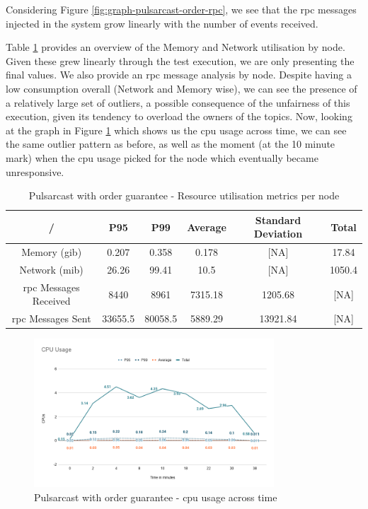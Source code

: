 Considering Figure \ref{fig:graph-pulsarcast-order-rpc}, we see that the
\acrshort{rpc} messages injected in the system grow linearly with the number of
events received.

Table \ref{table:pulsarcast-order} provides an overview of the Memory and
Network utilisation by node. Given these grew linearly through the test
execution, we are only presenting the final values. We also provide an \acrshort{rpc}
message analysis by node. Despite having a low consumption overall (Network and
Memory wise), we can see the presence of a relatively large set of outliers, a
possible consequence of the unfairness of this execution, given its tendency to
overload the owners of the topics. Now, looking at the graph in Figure
\ref{fig:graph-pulsarcast-order-cpu} which shows us the \acrshort{cpu} usage across time,
we can see the same outlier pattern as before, as well as the moment (at the 10
minute mark) when the \acrshort{cpu} usage picked for the node which eventually became
unresponsive.

\begin{table}[!htb]
\caption{Pulsarcast with order guarantee - Resource utilisation metrics per node}
\label{table:pulsarcast-order}
  \begin{center}
   \begin{tabular}{|c| c c c c c|} 
   \hline
   / & P95 & P99 & Average & Standard Deviation & Total \\ [0.5ex] 
   \hline\hline
   Memory (\acrshort{gib}) & 0.207 & 0.358 & 0.178 & [NA] & 17.84 \\
   \hline
   Network (\acrshort{mib}) & 26.26 & 99.41 & 10.5 & [NA] & 1050.4 \\
   \hline
   \acrshort{rpc} Messages Received & 8440 & 8961 & 7315.18 & 1205.68 & [NA] \\
   \hline
   \acrshort{rpc} Messages Sent & 33655.5 & 80058.5 & 5889.29 & 13921.84 & [NA] \\ [1ex] 
   \hline
  \end{tabular}
  \end{center}
\end{table}

\begin{figure}[!htb]
  \centering
  \includegraphics[width=0.8\textwidth]{img/graph-pulsarcast-order-cpu.png}
  \caption{Pulsarcast with order guarantee - \acrshort{cpu} usage across time}
  \label{fig:graph-pulsarcast-order-cpu}
\end{figure}

